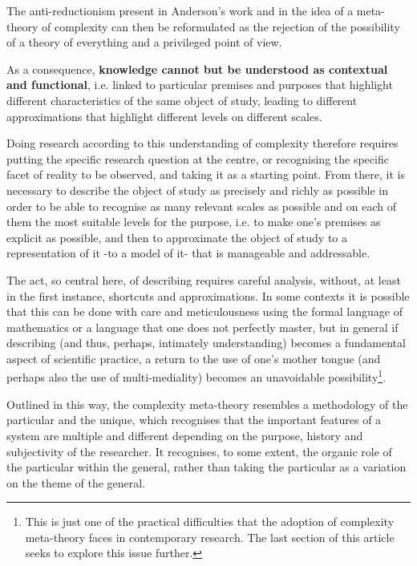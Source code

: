 The anti-reductionism present in Anderson's work and in the idea of a meta-theory of complexity can then be reformulated as the rejection of the possibility of a theory of everything and a privileged point of view.

As a consequence, \textbf{knowledge cannot but be understood as contextual and functional}, i.e. linked to particular premises and purposes that highlight different characteristics of the same object of study, leading to different approximations that highlight different levels on different scales.

Doing research according to this understanding of complexity therefore requires putting the specific research question at the centre, or recognising the specific facet of reality to be observed, and taking it as a starting point.
From there, it is necessary to describe the object of study as precisely and richly as possible in order to be able to recognise as many relevant scales as possible and on each of them the most suitable levels for the purpose, i.e. to make one's premises as explicit as possible, and then to approximate the object of study to a representation of it -to a model of it- that is manageable and addressable.

The act, so central here, of describing requires careful analysis, without, at least in the first instance, shortcuts and approximations. In some contexts it is possible that this can be done with care and meticulousness using the formal language of mathematics or a language that one does not perfectly master, but in general if describing (and thus, perhaps, intimately understanding) becomes a fundamental aspect of scientific practice, a return to the use of one's mother tongue (and perhaps also the use of multi-mediality) becomes an unavoidable possibility\footnote{This is just one of the practical difficulties that the adoption of complexity meta-theory faces in contemporary research. The last section of this article seeks to explore this issue further.}.

Outlined in this way, the complexity meta-theory resembles a methodology of the particular and the unique, which recognises that the important features of a system are multiple and different depending on the purpose, history and subjectivity of the researcher. It recognises, to some extent, the organic role of the particular within the general, rather than taking the particular as a variation on the theme of the general.

